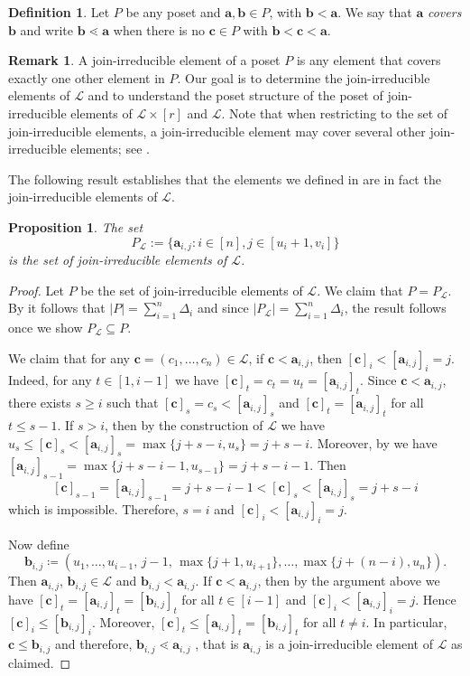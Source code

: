 \documentclass[11pt,a4paper,reqno,dvipsnames]{amsart}
\theoremstyle{plain}
\newtheorem{Proposition}[Theorem]{Proposition}
\theoremstyle{definition}
\newtheorem{Assumptions and Discussion}[Theorem]{Assumptions and Discussion}
\newtheorem{Definition}[Theorem]{Definition}
\newtheorem{Remark}[Theorem]{Remark}
\theoremstyle{remark}
\newcommand\bda{{\bm a}}
\newcommand\bdb{{\bm b}}
\newcommand\bdc{{\bm c}}
\newcommand\calL{\mathcal{L}}
\newcommand{\Lr}{\ensuremath{\calL\times[r]}}
\begin{document}
\begin{Definition} Let $P$ be any poset and $\bda ,\bdb \in P$, with $\bdb < \bda$. We say that $\bda$ \emph{covers} $\bdb$ and write $\bdb\lessdot \bda $ when there is no $\bdc\in P$ with $\bdb<\bdc<\bda$. 
\end{Definition}

\begin{Remark}
   A join-irreducible element of a poset $P$ is any element that covers exactly one other element in $P$. Our goal is to determine the join-irreducible elements of $\calL$ and to understand the poset structure of the poset of join-irreducible elements of $\Lr$ and $\calL$. 
   Note that when restricting to the set of join-irreducible elements, a join-irreducible element may cover several other join-irreducible elements; see .  
\end{Remark}



The following result establishes that the elements we defined in  are in fact the join-irreducible elements of $\calL$.


\begin{Proposition}\label{prop:join-irrL}
The set
\[ P_\calL := \{\bda_{i,j}: i\in[n], j\in[u_{i}+1, v_i]\} \]
is the set of join-irreducible elements of $\calL$. 
\end{Proposition}



\begin{proof}
Let $P$ be the set of join-irreducible elements of $\calL$. We claim that $P=P_{\calL}$. By  \cite[Corollary~4.24]{CFGLLLM} it follows that $|P|=\sum_{i=1}^{n}\Delta_i$ and since $|P_{\calL}|=\sum_{i=1}^{n}\Delta_i$, the result follows once we show $P_{\calL}\subseteq P$.  


We claim that for any $\bdc=(c_1,\ldots,c_n)\in \calL$, if $\bdc < \bda_{i,j}$, then $[\bdc]_i<[\bda_{i,j}]_i=j$. Indeed, for any $t\in [1,i-1]$ we have $[\bdc]_t=c_t=u_t=[\bda_{i,j}]_t$. Since $\bdc<\bda_{i,j}$, there exists $s\ge i$ such that $[\bdc]_s=c_s<[\bda_{i,j}]_s$ and $[\bdc]_t=[\bda_{i,j}]_t$ for all $t\le s-1$. If $s>i$, then by the construction of $\calL$ we have $u_s\le [\bdc]_{s}<[\bda_{i,j}]_s=\max\{j+s-i,u_s\}=j+s-i$. Moreover, by  we have $[\bda_{i,j}]_{s-1}=\max\{j+s-i-1,u_{s-1}\}=j+s-i-1$. Then 
$$[\bdc]_{s-1}=[\bda_{i,j}]_{s-1}=j+s-i-1<[\bdc]_{s}<[\bda_{i,j}]_s=j+s-i$$ which is impossible. Therefore, $s=i$ and $[\bdc]_i<[\bda_{i,j}]_i=j$.

Now define 
\[
\bdb_{i,j}\coloneq (u_1,\ldots,u_{i-1},\,j-1,\,\max\{j+1, u_{i+1}\}, \ldots, \max\{j+(n-i), u_n\}).
\]
Then $\bda_{i,j}$, $\bdb_{i,j}\in \calL$ and $\bdb_{i,j}<\bda_{i,j}$. If $\bdc<\bda_{i,j}$, then by the argument above we have $[\bdc]_t=[\bda_{i,j}]_t=[\bdb_{i,j}]_{t}$ for all $t\in [i-1]$ and $[\bdc]_i<[\bda_{i,j}]_i=j$. Hence $[\bdc]_i\le [\bdb_{i,j}]_i$. Moreover, $[\bdc]_t\le [\bda_{i,j}]_t=[\bdb_{i,j}]_t$ for all 
$t\neq i$. In particular, $\bdc\le \bdb_{i,j}$ and therefore, $\bdb_{i,j}\lessdot \bda_{i,j}$
, that is $\bda_{i,j}$ is a join-irreducible element of $\calL$ as claimed. 
\end{proof}
\end{document}
